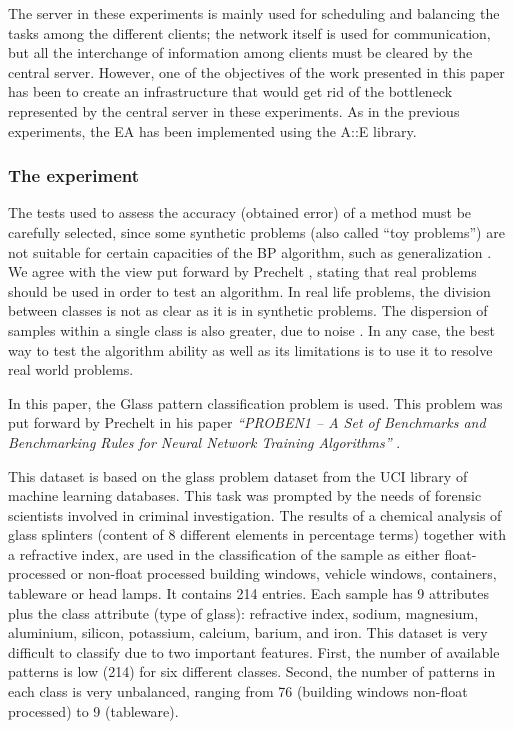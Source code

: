 \documentclass[final,1p,times]{elsarticle}
\begin{document}
The server in these experiments is mainly used for scheduling and balancing the tasks among the different clients; the network itself is used for communication, but all the interchange of information among clients must be cleared by the central server. However, one of the objectives of the work presented in this paper has been to create an infrastructure that would get rid of the bottleneck represented by the central server in these experiments.
As in the previous experiments, the EA has been implemented using the A::E library.




\subsubsection{The experiment}

The tests used to assess the accuracy (obtained error) of a method must be carefully selected, since some synthetic problems (also called ``toy problems'') are not suitable for certain capacities of the BP algorithm, such as generalization \cite{FahlmanBENCHMARKS}. 
We agree with the view put forward by Prechelt \cite{Prechelt94c}, stating that real problems should be used in order to test an algorithm.
In real life problems, the division between classes is not as clear as it is in synthetic problems. The dispersion of samples within a single class is also greater, due to noise \cite{merelo:ESNN}. 
In any case, the best way to test the algorithm ability as well as its limitations is to use it to resolve real world problems.

In this paper, the Glass pattern classification problem is used.
This problem was put forward by Prechelt in his paper \emph{``{PROBEN1 -- A Set of Benchmarks and Benchmarking Rules for Neural Network Training Algorithms}''} \cite{Prechelt94c}.

This dataset is based on the glass problem dataset from the UCI library of machine learning databases.
This task was prompted by the needs of forensic scientists involved in criminal investigation.
The results of a chemical analysis of glass splinters (content of 8 different elements in percentage terms) together with a refractive index, are used in the classification of the sample as either float-processed or non-float processed building windows, vehicle windows, containers, tableware or head lamps. 
It contains 214 entries. Each sample has 9 attributes plus the class attribute (type of glass): refractive index, sodium, magnesium, aluminium, silicon, potassium, calcium, barium, and iron.
This dataset is very difficult to classify due to two important features. First, the number of available patterns is low (214) for six different classes. Second, the number of patterns in each class is very unbalanced, ranging from 76 (building windows non-float processed) to 9 (tableware).
\end{document}
